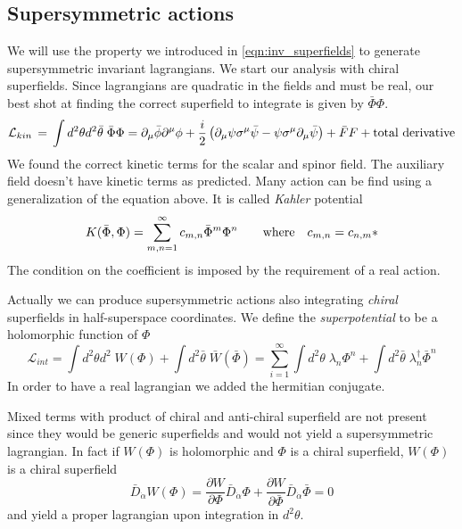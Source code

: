 \begin{appendices}
\section{Supersymmetric actions}
We will use the property we introduced in \ref{eqn:inv_superfields} to generate supersymmetric invariant lagrangians.
We start our analysis with chiral superfields.
Since lagrangians are quadratic in the fields and must be real, our best shot at finding the correct superfield to integrate is given by $ \bar{\Phi} \Phi$. 
\begin{equation}
 \mathcal{L}_{kin} \, = \, \int d^2 \theta d^2 \bar{\theta} \; \bar{\Phi} \Phi = \partial_{\mu} \bar{\phi} \partial^{\mu} \phi + \frac{i}{2} \left( \partial_{\mu} \psi \sigma^{\mu} \bar{\psi} - \psi \sigma^{\mu} \partial_{\mu} \bar{\psi} \right) + \bar{F} F + \hbox{total derivative}
\end{equation}		
We found the correct kinetic terms for the scalar and spinor field.
The auxiliary field doesn't have kinetic terms as predicted.
Many action can be find using a generalization of the equation above. It is called \emph{Kahler} potential   
\begin{equation}
K ( \bar{\Phi} , \Phi) = \sum_{m,n=1}^{\infty} c_{m,n} \bar{\Phi}^m \Phi^n \qquad \hbox{where} \quad c_{m,n} = c_{n,m}*
\end{equation}
The condition on the coefficient is imposed by the requirement of a real action. 

Actually we can produce supersymmetric actions also integrating \emph{chiral} superfields in half-superspace coordinates.
We define the \emph{superpotential} to be a holomorphic function of $\Phi$ 
\begin{equation}
 \mathcal{L}_{int} = \int  d^2 \theta d^2  \; W ( \Phi)  +  \int d^2 \bar{\theta} \; \bar{W} ( \bar{\Phi} ) = \sum_{i=1}^\infty  \int  d^2 \theta \; \lambda_n \Phi^n + \int d^2 \bar{\theta}\;  \lambda_n^{\dagger} \bar{\Phi}^n
\end{equation} 
In order to have a real lagrangian we added the hermitian conjugate.

Mixed terms with product of chiral and anti-chiral superfield are not present since they would be generic superfields and would not yield a supersymmetric lagrangian.
In fact if $W(\Phi)$ is holomorphic and $\Phi$ is a chiral superfield, $W(\Phi)$ is a chiral superfield
\begin{equation}
 \bar{D}_{\dot{\alpha}} W (\Phi) = \frac{\partial W}{ \partial \Phi } \bar{D}_{\dot{\alpha}} \Phi + \frac{\partial W}{ \partial \bar{\Phi} } \bar{D}_{\dot{\alpha}} \bar{\Phi}  = 0 
\end{equation}
and yield a proper lagrangian upon integration in $ d^2 \theta$.


\end{appendices}
